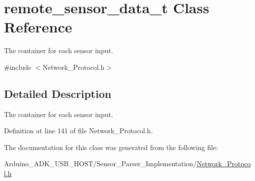\hypertarget{classremote__sensor__data__t}{\section{remote\-\_\-sensor\-\_\-data\-\_\-t Class Reference}
\label{classremote__sensor__data__t}
}


The container for each sensor input.  




{\ttfamily \#include $<$Network\-\_\-\-Protocol.\-h$>$}



\subsection{Detailed Description}
The container for each sensor input. 

Definition at line 141 of file Network\-\_\-\-Protocol.\-h.



The documentation for this class was generated from the following file\-:\begin{DoxyCompactItemize}
\item 
Arduino\-\_\-\-A\-D\-K\-\_\-\-U\-S\-B\-\_\-\-H\-O\-S\-T/\-Sensor\-\_\-\-Parser\-\_\-\-Implementation/\hyperlink{_network___protocol_8h}{Network\-\_\-\-Protocol.\-h}\end{DoxyCompactItemize}
